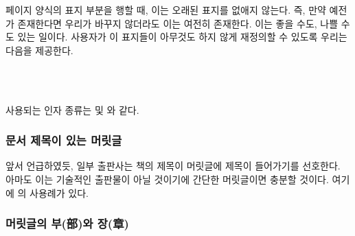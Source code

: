  페이지 양식의 표지 부분을 행할 때, 이는 오래된 표지를 없애지 않는다.
즉, 만약 예전 \cmd{\sectionmark}가 존재한다면 우리가 바꾸지 않더라도 이는
여전히 존재한다.
이는 좋을 수도, 나쁠 수도 있는 일이다.
사용자가 이 표지들이 아무것도 하지 않게 재정의할 수 있도록 우리는 다음을
제공한다.
\begin{syntax}
\cmd{\clearplainmark}\\
\cmd{\clearmark}\\  
\end{syntax}
사용되는 인자 종류는 \cmd{\createplainmark} 및 \cmd{\createmark}와 같다.



\subsubsection{문서 제목이 있는 머릿글}

앞서 언급하였듯, 일부 출판사는 책의 제목이 머릿글에 제목이 들어가기를 선호한다.
아마도 이는 기술적인 출판물이 아닐 것이기에 간단한 머릿글이면 충분할 것이다.
여기에 의 사용례가 있다.
\begin{lcode}
\end{lcode}

\subsubsection{머릿글의 부(部)와 장(章)}

